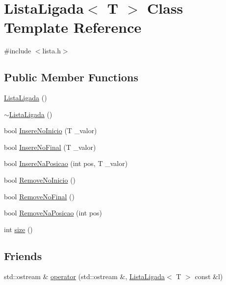 \hypertarget{classListaLigada}{\section{Lista\-Ligada$<$ T $>$ Class Template Reference}
\label{classListaLigada}
}


{\ttfamily \#include $<$lista.\-h$>$}

\subsection*{Public Member Functions}
\begin{DoxyCompactItemize}
\item 
\hyperlink{classListaLigada_aceed3c08dcb208b4622b317c5cef104b}{Lista\-Ligada} ()
\item 
\hyperlink{classListaLigada_a2e171a163616642932b7db0c19aa5b49}{$\sim$\-Lista\-Ligada} ()
\item 
bool \hyperlink{classListaLigada_ae5c528807334f89f5fa34beab6cccebf}{Insere\-No\-Inicio} (T \-\_\-valor)
\item 
bool \hyperlink{classListaLigada_a0a7a7ca52d16deda399c51e9c32aa167}{Insere\-No\-Final} (T \-\_\-valor)
\item 
bool \hyperlink{classListaLigada_ae42913bdf31cb66ab4a0eec0e207e843}{Insere\-Na\-Posicao} (int pos, T \-\_\-valor)
\item 
bool \hyperlink{classListaLigada_a96e263fe9ff0385719a67680d2d9eadc}{Remove\-No\-Inicio} ()
\item 
bool \hyperlink{classListaLigada_a48a1b9c8e883f6db2e0d68cfd18e0793}{Remove\-No\-Final} ()
\item 
bool \hyperlink{classListaLigada_a5e47ccba3363b97c6223d8867f18bbf7}{Remove\-Na\-Posicao} (int pos)
\item 
int \hyperlink{classListaLigada_aaa0fe8d3ea92daa521f97d5aa1936ae6}{size} ()
\end{DoxyCompactItemize}
\subsection*{Friends}
\begin{DoxyCompactItemize}
\item 
std\-::ostream \& \hyperlink{classListaLigada_a39cff4b79a3afa0ae93c15e24359f04c}{operator} (std\-::ostream \&, \hyperlink{classListaLigada}{Lista\-Ligada}$<$ T $>$ const \&l)
\end{DoxyCompactItemize}


